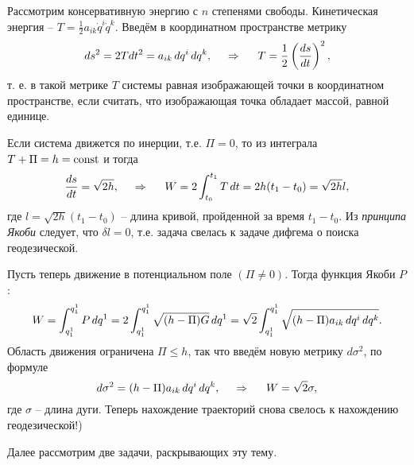 Рассмотрим консервативную энергию с $n$ степенями свободы. Кинетическая энергия -- $T = \frac{1}{2} a_{ik} \dot{q}^i \dot{q}^k$. Введём в координатном пространстве метрику
\begin{equation*}
    ds^2 = 2 T dt^2 = a_{ik} \, d q^i \, d q^k,
    \hspace{0.5cm} \Rightarrow \hspace{0.5cm} 
    T = \frac{1}{2} \left(\frac{d s}{d t} \right)^2,
\end{equation*}
т. е. в такой метрике $T$ системы равная изображающей точки в координатном пространстве, если считать, что изображающая точка обладает массой, равной единице.

Если система движется по инерции, т.е. $\Pi = 0$, то из интеграла $T + \Pi = h = \text{const}$ и тогда
\begin{equation*}
    \frac{d s}{d t} = \sqrt{2 h},
    \hspace{0.5cm} \Rightarrow \hspace{0.5cm} 
    W = 2 \int_{t_0}^{t_1} T \, d t = 2 h (t_1 - t_0) = \sqrt{2h} l,
\end{equation*}
где $l = \sqrt{2h} (t_1-t_0)$ -- длина кривой, пройденной за время $t_1-t_0$. Из \textit{принципа Якоби} следует, что $\delta l = 0$, т.е. задача свелась к задаче дифгема о поиска геодезической.

Пусть теперь движение в потенциальном поле $(\Pi \neq 0)$. Тогда функция Якоби $P$:
\begin{equation*}
    W = \int_{q^{1}_1}^{q_1^1} P \, d q^1 = 
    2 \int_{q^{1}_1}^{q_1^1}
    \sqrt{ (h - \Pi) G} \, d q^1 
    =
    \sqrt{2} \int_{q^{1}_1}^{q_1^1} 
    \sqrt{
        (h-\Pi) a_{ik} \, d q^i \, d q^k
    }.
\end{equation*}
Область движения ограничена $\Pi \leq h$, так что введём новую метрику $d \sigma^2$, по формуле
\begin{equation*}
    d \sigma^2 = (h - \Pi) a_{ik} \, d q^i \, d q^k,
    \hspace{0.5cm} \Rightarrow \hspace{0.5cm} 
    W = \sqrt{2} \sigma,
\end{equation*}
где $\sigma$ -- длина дуги. Теперь нахождение траекторий снова свелось к нахождению геодезической!)

Далее рассмотрим две задачи, раскрывающих эту тему.













